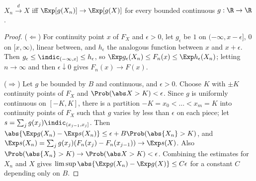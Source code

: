 \begin{theorem}\label{thm:portmanteau}
$X_n\xrightarrow{d}X$ iff $\Exp[g(X_n)]\to\Exp[g(X)]$ for every bounded continuous
$g:\R\to\R$.
\end{theorem}
\begin{proof}
($\Leftarrow$) For continuity point $x$ of $F_X$ and $\epsilon>0$, let $g_\epsilon$ be $1$ on
$(-\infty,x-\epsilon]$, $0$ on $[x,\infty)$, linear between, and $h_\epsilon$ the analogous
function between $x$ and $x+\epsilon$. Then $g_\epsilon\le\indic_{(-\infty,x]}\le h_\epsilon$,
so $\Exp g_\epsilon(X_n)\le F_n(x)\le\Exp h_\epsilon(X_n)$; letting $n\to\infty$ and then
$\epsilon\downarrow0$ gives $F_n(x)\to F(x)$.

($\Rightarrow$) Let $g$ be bounded by $B$ and continuous, and $\epsilon>0$. Choose $K$ with
$\pm K$ continuity points of $F_X$ and $\Prob(\abs X>K)<\epsilon$. Since $g$ is uniformly
continuous on $[-K,K]$, there is a partition $-K=x_0<\dots<x_m=K$ into continuity points of
$F_X$ such that $g$ varies by less than $\epsilon$ on each piece; let
$s=\sum_jg(x_j)\indic_{(x_{j-1},x_j]}$. Then $\abs{\Exp g(X_n)-\Exp s(X_n)}\le\epsilon+B\Prob(\abs{X_n}>K)$,
and $\Exp s(X_n)=\sum_jg(x_j)(F_n(x_j)-F_n(x_{j-1}))\to\Exp s(X)$. Also
$\Prob(\abs{X_n}>K)\to\Prob(\abs X>K)<\epsilon$. Combining the estimates for $X_n$ and $X$ gives
$\limsup\abs{\Exp g(X_n)-\Exp g(X)}\le C\epsilon$ for a constant $C$ depending only on $B$.
\end{proof}

